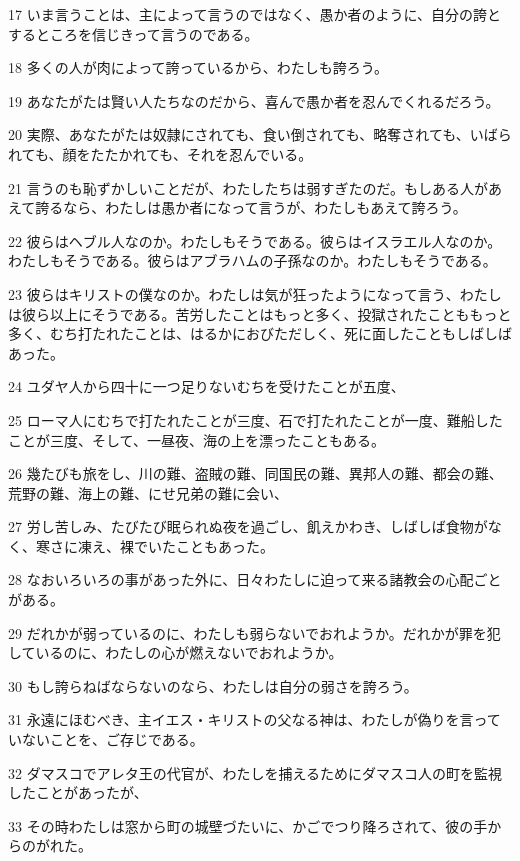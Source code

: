 \par 17 いま言うことは、主によって言うのではなく、愚か者のように、自分の誇とするところを信じきって言うのである。
\par 18 多くの人が肉によって誇っているから、わたしも誇ろう。
\par 19 あなたがたは賢い人たちなのだから、喜んで愚か者を忍んでくれるだろう。
\par 20 実際、あなたがたは奴隷にされても、食い倒されても、略奪されても、いばられても、顔をたたかれても、それを忍んでいる。
\par 21 言うのも恥ずかしいことだが、わたしたちは弱すぎたのだ。もしある人があえて誇るなら、わたしは愚か者になって言うが、わたしもあえて誇ろう。
\par 22 彼らはヘブル人なのか。わたしもそうである。彼らはイスラエル人なのか。わたしもそうである。彼らはアブラハムの子孫なのか。わたしもそうである。
\par 23 彼らはキリストの僕なのか。わたしは気が狂ったようになって言う、わたしは彼ら以上にそうである。苦労したことはもっと多く、投獄されたことももっと多く、むち打たれたことは、はるかにおびただしく、死に面したこともしばしばあった。
\par 24 ユダヤ人から四十に一つ足りないむちを受けたことが五度、
\par 25 ローマ人にむちで打たれたことが三度、石で打たれたことが一度、難船したことが三度、そして、一昼夜、海の上を漂ったこともある。
\par 26 幾たびも旅をし、川の難、盗賊の難、同国民の難、異邦人の難、都会の難、荒野の難、海上の難、にせ兄弟の難に会い、
\par 27 労し苦しみ、たびたび眠られぬ夜を過ごし、飢えかわき、しばしば食物がなく、寒さに凍え、裸でいたこともあった。
\par 28 なおいろいろの事があった外に、日々わたしに迫って来る諸教会の心配ごとがある。
\par 29 だれかが弱っているのに、わたしも弱らないでおれようか。だれかが罪を犯しているのに、わたしの心が燃えないでおれようか。
\par 30 もし誇らねばならないのなら、わたしは自分の弱さを誇ろう。
\par 31 永遠にほむべき、主イエス・キリストの父なる神は、わたしが偽りを言っていないことを、ご存じである。
\par 32 ダマスコでアレタ王の代官が、わたしを捕えるためにダマスコ人の町を監視したことがあったが、
\par 33 その時わたしは窓から町の城壁づたいに、かごでつり降ろされて、彼の手からのがれた。

